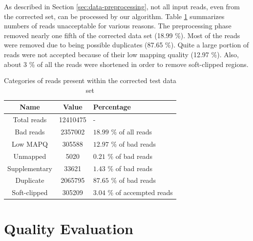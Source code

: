As described in Section \ref{sec:data-preprocessing}, not all input reads, even from the corrected set, can be processed by our algorithm. Table \ref{tab:corrected-set-categories} summarizes numbers of reads unacceptable for various reasons. The preprocessing phase removed nearly one fifth of the corrected data set (18.99 \%). Most of the reads were removed due to being possible duplicates (87.65 \%). Quite a large portion of  reads were not accepted because of their low mapping quality (12.97 \%). Also, about 3 \% of all the reads were shortened in order to remove soft-clipped regions.

\begin{table}[h]
\begin{center}
\caption{Categories of reads present within the corrected test data set}
\label{tab:corrected-set-categories}
\begin{tabular}{| c | c | p{5cm} |}
\hline
Name & Value & Percentage \\
\hline
Total reads & 12410475 & - \\
\hline
Bad reads & 2357002  & $18.99$ \% of all reads \\
\hline
Low MAPQ & 305588 & $12.97$ \% of bad reads \\
\hline
Unmapped & 5020 & $0.21$ \% of bad reads \\
\hline
Supplementary & 33621 & $1.43$ \% of bad reads \\
\hline
Duplicate & 2065795 & $87.65$ \% of bad reads \\
\hline
Soft-clipped & 305209 & $3.04$ \% of accempted reads \\
\hline
\end{tabular}
\end{center}
\end{table}

\section{Quality Evaluation}
\label{sec:quality-evaulation}

